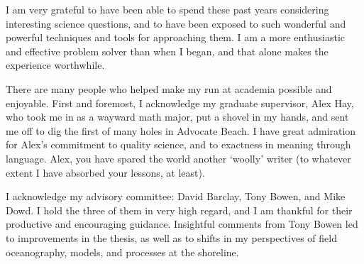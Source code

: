 \begin{acknowledgements}
%

	
I am very grateful to have been able to spend these past years considering interesting science questions, and to have been exposed to such wonderful and powerful techniques and tools for approaching them. I am a more enthusiastic and effective problem solver than when I began, and that alone makes the experience worthwhile.

There are many people who helped make my run at academia possible and enjoyable. First and foremost, I acknowledge my graduate supervisor, Alex Hay, who took me in as a wayward math major, put a shovel in my hands, and sent me off to dig the first of many holes in Advocate Beach. I have great admiration for Alex's commitment to quality science, and to exactness in meaning through language. Alex, you have spared the world another `woolly' writer (to whatever extent I have absorbed your lessons, at least).

I acknowledge my advisory committee: David Barclay, Tony Bowen, and Mike Dowd. I hold the three of them in very high regard, and I am thankful for their productive and encouraging guidance. Insightful comments from Tony Bowen led to improvements in the thesis, as well as to shifts in my perspectives of field oceanography, models, and processes at the shoreline.%


\end{acknowledgements}
